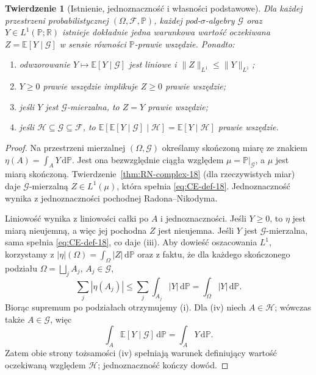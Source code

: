 \documentclass[11pt,a4paper,oneside]{book}
\numberwithin{equation}{chapter}
\theoremstyle{plain}
\newtheorem{twierdzenie}{Twierdzenie}[chapter]
\theoremstyle{definition}
\theoremstyle{remark}
\begin{document}
\begin{twierdzenie}[Istnienie, jednoznaczność i własności podstawowe]
\label{thm:CE-existence-18}
Dla każdej przestrzeni probabilistycznej
$(\Omega,\mathcal F,\mathbb P)$, każdej
pod-$\sigma$-algebry $\mathcal G$ oraz $Y\in L^1(\mathbb P;\mathbb R)$
istnieje dokładnie jedna warunkowa wartość oczekiwana
$Z=\mathbb E[Y\mid\mathcal G]$ w sensie równości
$\mathbb P$-prawie wszędzie. Ponadto:
\begin{enumerate}[label=\textup{(\roman*)}]
\item odwzorowanie $Y\mapsto\mathbb E[Y\mid\mathcal G]$
jest liniowe i $\|Z\|_{L^1}\le\|Y\|_{L^1}$;
\item $Y\ge0$ prawie wszędzie implikuje $Z\ge0$
prawie wszędzie;
\item jeśli $Y$ jest $\mathcal G$-mierzalna,
to $Z=Y$ prawie wszędzie;
\item jeśli $\mathcal H\subseteq\mathcal G\subseteq\mathcal F$,
to $\mathbb E[\mathbb E[Y\mid\mathcal G]\mid\mathcal H]
=\mathbb E[Y\mid\mathcal H]$ prawie wszędzie.
\end{enumerate}
\end{twierdzenie}
\begin{proof}
Na przestrzeni mierzalnej $(\Omega,\mathcal G)$
określamy skończoną miarę ze znakiem
$\eta(A)=\int_A Y\,\mathrm d\mathbb P$.
Jest ona bezwzględnie ciągła względem
$\mu=\mathbb P|_{\mathcal G}$, a $\mu$ jest miarą
skończoną. Twierdzenie~\ref{thm:RN-complex-18}
(dla rzeczywistych miar) daje $\mathcal G$-mierzalną
$Z\in L^1(\mu)$, która spełnia
\eqref{eq:CE-def-18}. Jednoznaczność wynika z
jednoznaczności pochodnej Radona--Nikodyma.

Liniowość wynika z liniowości całki po $A$ i
jednoznaczności. Jeśli $Y\ge0$, to $\eta$ jest
miarą nieujemną, a więc jej pochodna $Z$ jest
nieujemna. Jeśli $Y$ jest $\mathcal G$-mierzalna,
sama spełnia \eqref{eq:CE-def-18}, co daje (iii).
Aby dowieść oszacowania $L^1$, korzystamy z
$|\eta|(\Omega)=\int_\Omega|Z|\,\mathrm d\mathbb P$
oraz z faktu, że dla każdego skończonego podziału
$\Omega=\bigsqcup_jA_j$, $A_j\in\mathcal G$,
\[
\sum_j|\eta(A_j)|
\le\sum_j\int_{A_j}|Y|\,\mathrm d\mathbb P
=\int_\Omega|Y|\,\mathrm d\mathbb P.
\]
Biorąc supremum po podziałach otrzymujemy (i).
Dla (iv) niech $A\in\mathcal H$; wówczas także
$A\in\mathcal G$, więc
\[
\int_A\mathbb E[Y\mid\mathcal G] \,\mathrm d\mathbb P
=\int_A Y\,\mathrm d\mathbb P.
\]
Zatem obie strony tożsamości (iv) spełniają
warunek definiujący wartość oczekiwaną względem
$\mathcal H$; jednoznaczność kończy dowód.
\end{proof}
\end{document}
